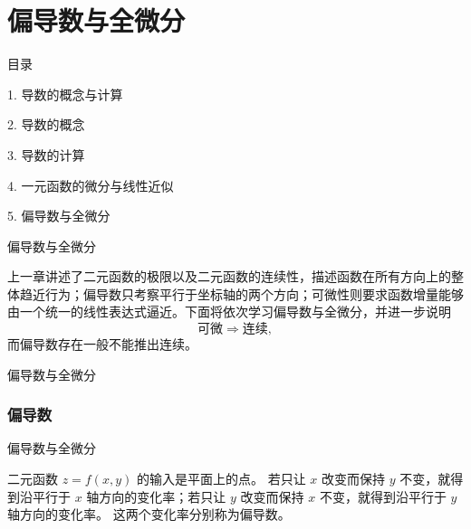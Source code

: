 \documentclass[aspectratio=169,10pt,fontset=fandol]{ctexbeamer}
\begin{document}
\section{偏导数与全微分}
\begin{frame}[t,fragile]{目录}
\normalsize
{\color{black}\normalsize 1. 导数的概念与计算\par}\vspace{0.22em}
{\color{black}\normalsize 2. 导数的概念\par}\vspace{0.22em}
{\color{black}\normalsize 3. 导数的计算\par}\vspace{0.22em}
{\color{black}\normalsize 4. 一元函数的微分与线性近似\par}\vspace{0.22em}
{\color{blue}\normalsize 5. 偏导数与全微分\par}\vspace{0.22em}
\end{frame}
\begin{frame}[t,fragile]{偏导数与全微分}
\footnotesize
{\footnotesize
	
	上一章讲述了二元函数的极限以及二元函数的连续性，描述函数在所有方向上的整体趋近行为；偏导数只考察平行于坐标轴的两个方向；可微性则要求函数增量能够由一个统一的线性表达式逼近。下面将依次学习偏导数与全微分，并进一步说明
	\[
	\text{可微}\Longrightarrow\text{连续},
	\]
	而偏导数存在一般不能推出连续。


}
\end{frame}
\begin{frame}[t,fragile]{偏导数与全微分}
\footnotesize
{\footnotesize
\subsubsection*{偏导数}


}
\end{frame}
\begin{frame}[t,fragile]{偏导数与全微分}
\footnotesize
{\footnotesize
二元函数 $z=f(x,y)$ 的输入是平面上的点。 若只让 $x$ 改变而保持 $y$ 不变，就得到沿平行于 $x$ 轴方向的变化率；若只让 $y$ 改变而保持 $x$ 不变，就得到沿平行于 $y$ 轴方向的变化率。 这两个变化率分别称为偏导数。


}
\end{frame}
\end{document}
